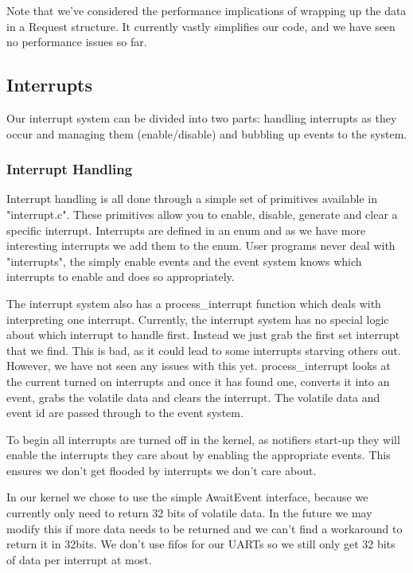 \documentclass{article}
\begin{document}
Note that we've considered the performance implications of wrapping up the data in a Request structure. It currently vastly simplifies our code, and we have seen no performance issues so far.

\subsection{Interrupts}

Our interrupt system can be divided into two parts: handling interrupts as they occur and managing them (enable/disable) and bubbling up events to the system.

\subsubsection{Interrupt Handling}

Interrupt handling is all done through a simple set of primitives available in "interrupt.c". These primitives allow you to enable, disable, generate and clear a specific interrupt. Interrupts are defined in an enum and as we have more interesting interrupts we add them to the enum. User programs never deal with "interrupts", the simply enable events and the event system knows which interrupts to enable and does so appropriately.

The interrupt system also has a process\_interrupt function which deals with interpreting one interrupt. Currently, the interrupt system has no special logic about which interrupt to handle first. Instead we just grab the first set interrupt that we find. This is bad, as it could lead to some interrupts starving others out. However, we have not seen any issues with this yet. process\_interrupt looks at the current turned on interrupts and once it has found one, converts it into an event, grabs the volatile data and clears the interrupt. The volatile data and event id are passed through to the event system.

To begin all interrupts are turned off in the kernel, as notifiers start-up they will enable the interrupts they care about by enabling the appropriate events. This ensures we don't get flooded by interrupts we don't care about.

In our kernel we chose to use the simple AwaitEvent interface, because we currently only need to return 32 bits of volatile data. In the future we may modify this if more data needs to be returned and we can't find a workaround to return it in 32bits. We don't use fifos for our UARTs so we still only get 32 bits of data per interrupt at most.
\end{document}
